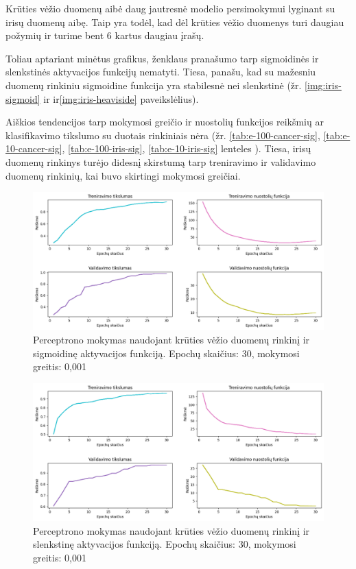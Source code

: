 \documentclass{VUMIFPSbakalaurinis}
\begin{document}
Krūties vėžio duomenų aibė daug jautresnė modelio persimokymui lyginant
su irisų duomenų aibę. Taip yra todėl, kad dėl krūties vėžio duomenys
turi daugiau požymių ir turime bent 6 kartus daugiau įrašų.


Toliau aptariant minėtus grafikus, ženklaus pranašumo
tarp sigmoidinės ir slenkstinės aktyvacijos funkcijų nematyti.
Tiesa, panašu, kad su mažesniu duomenų rinkiniu sigmoidine funkcija
yra stabilesnė nei slenkstinė (žr. \ref{img:iris-sigmoid} ir ir\ref{img:iris-heaviside}
paveikslėlius).

Aiškios tendencijos tarp mokymosi greičio ir nuostolių funkcijos reikšmių ar 
klasifikavimo tikslumo su duotais rinkiniais nėra (žr. \ref{tab:e-100-cancer-sig},
\ref{tab:e-10-cancer-sig}, \ref{tab:e-100-iris-sig}, \ref{tab:e-10-iris-sig} lenteles ).
Tiesa, irisų duomenų rinkinys turėjo didesnį skirstumą tarp treniravimo ir validavimo
duomenų rinkinių, kai buvo skirtingi mokymosi greičiai.


\begin{figure}[H]
  \centering
  \includegraphics[scale=0.5]{img/1.png}
  \caption{Perceptrono mokymas naudojant krūties vėžio
   duomenų rinkinį ir sigmoidinę aktyvacijos funkciją.
   Epochų skaičius: 30, mokymosi greitis: 0,001}
  \label{img:cancer-sigmoid}
\end{figure}

\begin{figure}[H]
  \centering
  \includegraphics[scale=0.5]{img/2.png}
  \caption{Perceptrono mokymas naudojant krūties vėžio
   duomenų rinkinį ir slenkstinę aktyvacijos funkciją.
   Epochų skaičius: 30, mokymosi greitis: 0,001}
  \label{img:cancer-heaviside}
\end{figure}
\end{document}
